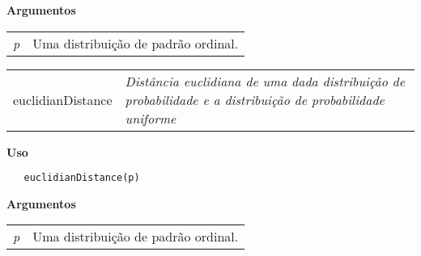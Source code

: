 \documentclass[12pt,letterpaper]{article}
\begin{document}
\textbf{Argumentos}

\begin{table}[!h]
\begin{center}
\begin{tabularx}{\textwidth}{X X}
\hspace{0.5cm} \textit{p} & Uma distribuição de padrão ordinal.\\
\end{tabularx}
\end{center}
\end{table} 
\newpage

\hrulefill   

\begin{table}[!h]
\begin{center}
\begin{tabularx}{\textwidth}{ X X}
\hspace{0.5cm} euclidianDistance & \textit{Distância euclidiana de uma dada distribuição de probabilidade e a distribuição de probabilidade uniforme}\\
\end{tabularx}
\end{center}
\end{table} 

\vspace{-0.5cm}

\hrulefill  

\vspace{0.5cm}

\textbf{Uso}

\begin{lstlisting}
   euclidianDistance(p)
\end{lstlisting}

\vspace{0.5cm}

\textbf{Argumentos}

\begin{table}[!h]
\begin{center}
\begin{tabularx}{\textwidth}{X X}
\hspace{0.5cm} \textit{p} & Uma distribuição de padrão ordinal.\\
\end{tabularx}
\end{center}
\end{table} 

\end{document}
